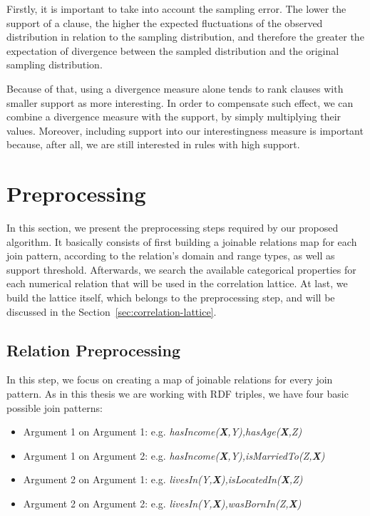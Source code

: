 Firstly, it is important to take into account the sampling error. The lower the support of a clause, the higher the
expected fluctuations of the observed distribution in relation to the sampling distribution, and therefore the greater
the expectation of divergence between the sampled distribution and the original sampling distribution.

Because of that, using a divergence measure alone tends to rank clauses with smaller support as more interesting. In
order to compensate such effect, we can combine a divergence measure with the support, by simply multiplying their
values. Moreover, including support into our interestingness measure is important because, after all, we are still
interested in rules with high support.

\section{Preprocessing}

In this section, we present the preprocessing steps required by our proposed algorithm. It basically consists of
first building a joinable relations map for each join pattern, according to the relation's domain and range types, as
well as support threshold. Afterwards, we search the available categorical properties for each numerical relation that
will be used in the correlation lattice. At last, we build the lattice itself, which belongs to the preprocessing step,
and will be discussed in the Section~\ref{sec:correlation-lattice}.                                              
        
\subsection{Relation Preprocessing}

In this step, we focus on creating a map of joinable relations for every join pattern. As in this thesis we
are working with RDF triples, we have four basic possible join patterns:

\begin{itemize}
 \item Argument 1 on Argument 1: e.g. \emph{hasIncome(\textbf{X},Y),hasAge(\textbf{X},Z)}
 \item Argument 1 on Argument 2: e.g. \emph{hasIncome(\textbf{X},Y),isMarriedTo(Z,\textbf{X})}
 \item Argument 2 on Argument 1: e.g. \emph{livesIn(Y,\textbf{X}),isLocatedIn(\textbf{X},Z)}
 \item Argument 2 on Argument 2: e.g. \emph{livesIn(Y,\textbf{X}),wasBornIn(Z,\textbf{X})}
\end{itemize}

